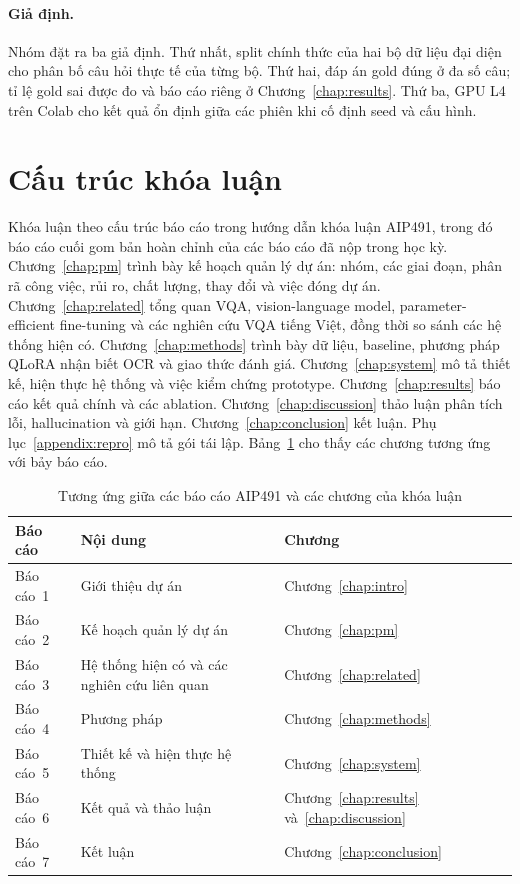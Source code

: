 \paragraph{Giả định.} Nhóm đặt ra ba giả định. Thứ nhất, split chính thức của hai
bộ dữ liệu đại diện cho phân bố câu hỏi thực tế của từng bộ. Thứ hai, đáp án gold
đúng ở đa số câu; tỉ lệ gold sai được đo và báo cáo riêng ở
Chương~\ref{chap:results}. Thứ ba, GPU L4 trên Colab cho kết quả ổn định giữa các
phiên khi cố định seed và cấu hình.

\section{Cấu trúc khóa luận}
\label{sec:intro-outline}

Khóa luận theo cấu trúc báo cáo trong hướng dẫn khóa luận AIP491, trong đó báo cáo cuối
gom bản hoàn chỉnh của các báo cáo đã nộp trong học kỳ. Chương~\ref{chap:pm} trình bày kế
hoạch quản lý dự án: nhóm, các giai đoạn, phân rã công việc, rủi ro, chất lượng, thay đổi và
việc đóng dự án. Chương~\ref{chap:related} tổng quan VQA, vision-language model,
parameter-efficient fine-tuning và các nghiên cứu VQA tiếng Việt, đồng thời so sánh các hệ
thống hiện có. Chương~\ref{chap:methods} trình bày dữ liệu, baseline, phương pháp QLoRA nhận
biết OCR và giao thức đánh giá. Chương~\ref{chap:system} mô tả thiết kế, hiện thực hệ thống
và việc kiểm chứng prototype. Chương~\ref{chap:results} báo cáo kết quả chính và các
ablation. Chương~\ref{chap:discussion} thảo luận phân tích lỗi, hallucination và giới hạn.
Chương~\ref{chap:conclusion} kết luận. Phụ lục~\ref{appendix:repro} mô tả gói tái lập.
Bảng~\ref{tab:intro-aip491} cho thấy các chương tương ứng với bảy báo cáo.

\begin{table}[htbp]
\caption{Tương ứng giữa các báo cáo AIP491 và các chương của khóa luận}
\label{tab:intro-aip491}
\centering
\small
\begin{tabular}{p{}p{}p{}}
\toprule
\raggedright \textbf{Báo cáo} & \raggedright \textbf{Nội dung} & \raggedright \textbf{Chương} \tabularnewline
\midrule
\raggedright Báo cáo~1 & \raggedright Giới thiệu dự án & \raggedright Chương~\ref{chap:intro} \tabularnewline
\raggedright Báo cáo~2 & \raggedright Kế hoạch quản lý dự án & \raggedright Chương~\ref{chap:pm} \tabularnewline
\raggedright Báo cáo~3 & \raggedright Hệ thống hiện có và các nghiên cứu liên quan & \raggedright Chương~\ref{chap:related} \tabularnewline
\raggedright Báo cáo~4 & \raggedright Phương pháp & \raggedright Chương~\ref{chap:methods} \tabularnewline
\raggedright Báo cáo~5 & \raggedright Thiết kế và hiện thực hệ thống & \raggedright Chương~\ref{chap:system} \tabularnewline
\raggedright Báo cáo~6 & \raggedright Kết quả và thảo luận & \raggedright Chương~\ref{chap:results} và~\ref{chap:discussion} \tabularnewline
\raggedright Báo cáo~7 & \raggedright Kết luận & \raggedright Chương~\ref{chap:conclusion} \tabularnewline
\bottomrule
\end{tabular}
\end{table}
